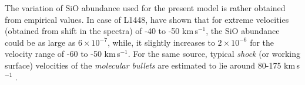 \documentclass[useAMS,usenatbib]{mn2e}
\begin{document}
The variation of SiO abundance used for the present model is rather
obtained from empirical values. In case of L1448, \cite{MartinPintado:1992p14309}
have shown that for extreme velocities (obtained from shift in the
spectra) of -40 to -50 km\,s$^{-1}$, the SiO abundance could be as
large as $6\times10^{-7}$, while, it slightly increases to
$2\times10^{-6}$ for the velocity range of -60 to -50
km\,s$^{-1}$. For the same source, typical {\em{shock}} (or working
surface) velocities of the {\em{molecular bullets}} are estimated to
lie around 80-175 km\,s$^{-1}$ \cite{Dutrey:1997p11185}.






   
 

\newpage


\label{lastpage}
\end{document}
